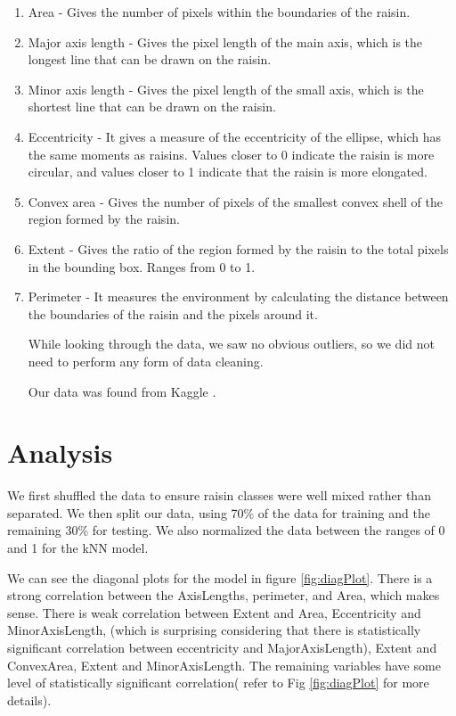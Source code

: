 \documentclass{article}
\begin{document}
\begin{enumerate}
    \item Area - Gives the number of pixels within the boundaries of the raisin.
\item Major axis length - Gives the pixel length of the main axis, which is the longest line that can be drawn on the raisin.

\item Minor axis length - Gives the pixel length of the small axis, which is the shortest line that can be drawn on the raisin.

\item Eccentricity - It gives a measure of the eccentricity of the ellipse, which has the same moments as raisins.  Values closer to 0 indicate the raisin is more circular, and values closer to 1 indicate that the raisin is more elongated.

\item Convex area - Gives the number of pixels of the smallest convex shell of the region formed by the raisin.

\item Extent - Gives the ratio of the region formed by the raisin to the total pixels in the bounding box.  Ranges from 0 to 1.

\item Perimeter - It measures the environment by calculating the distance between the boundaries of the raisin and the pixels around it.

While looking through the data, we saw no obvious outliers, so we did not need to perform any form of data cleaning. 

Our data was found from Kaggle \cite{Raisin}. 

\end{enumerate}

\section*{Analysis}

We first shuffled the data to ensure raisin classes were well mixed rather than separated. We then split our data, using 70\% of the data for training and the remaining 30\% for testing. We also normalized the data between the ranges of 0 and 1 for the kNN model. 

\vspace{5mm}

\noindent We can see the diagonal plots for the model in figure \ref{fig:diagPlot}. There is a strong correlation between the AxisLengths, perimeter, and  Area, which makes sense. There is weak correlation between Extent and Area, Eccentricity and MinorAxisLength, (which is surprising considering that there is statistically significant correlation between eccentricity and MajorAxisLength), Extent and ConvexArea, Extent and MinorAxisLength. The remaining variables have some level of statistically significant correlation( refer to Fig \ref{fig:diagPlot} for more details).
\end{document}
